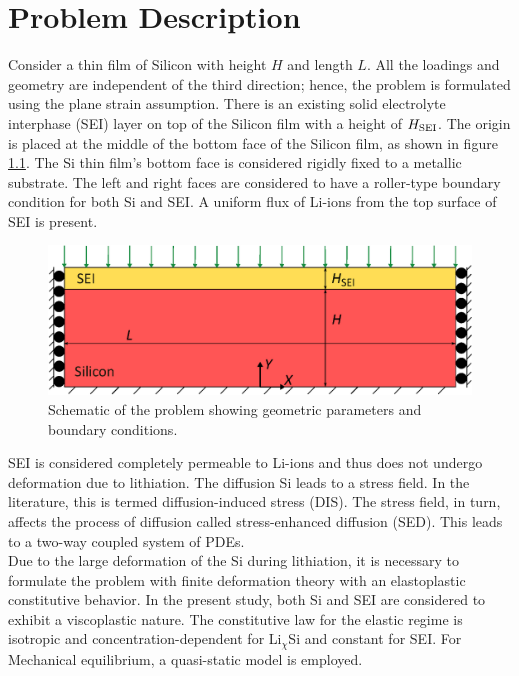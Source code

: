 \chapter{Problem Description}
Consider a thin film of Silicon with height $H$ and length $L$. All the loadings and geometry are independent of the third direction; hence, the problem is formulated using the plane strain assumption. There is an existing solid electrolyte interphase (SEI) layer on top of the Silicon film with a height of $H_{\rm{SEI}}$. The origin is placed at the middle of the bottom face of the Silicon film, as shown in figure \ref{fig:probDesc}. The Si thin film's bottom face is considered rigidly fixed to a metallic substrate. The left and right faces are considered to have a roller-type boundary condition for both Si and SEI. A uniform flux of Li-ions from the top surface of SEI is present. 
\begin{figure}[H]
    \centering
    \includegraphics[width=\textwidth]{figures/probDescFigs/drawing.eps}
    \caption{Schematic of the problem showing geometric parameters and boundary conditions.}
    \label{fig:probDesc}
\end{figure}
SEI is considered completely permeable to Li-ions and thus does not undergo deformation due to lithiation. The diffusion Si leads to a stress field. In the literature, this is termed diffusion-induced stress (DIS). The stress field, in turn, affects the process of diffusion called stress-enhanced diffusion (SED). This leads to a two-way coupled system of PDEs.\\
Due to the large deformation of the Si during lithiation, it is necessary to formulate the problem with finite deformation theory with an elastoplastic constitutive behavior. In the present study, both Si and SEI are considered to exhibit a viscoplastic nature. The constitutive law for the elastic regime is isotropic and concentration-dependent for Li$_\chi$Si and constant for SEI. 
For Mechanical equilibrium, a quasi-static model is employed.